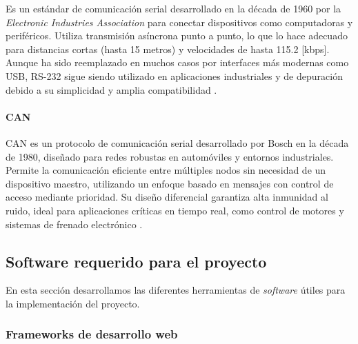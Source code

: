 Es un estándar de comunicación serial desarrollado en la década de 1960 por la \textit{Electronic Industries Association} para conectar dispositivos como computadoras y periféricos. Utiliza transmisión asíncrona punto a punto, lo que lo hace adecuado para distancias cortas (hasta 15 metros) y velocidades de hasta 115.2 [kbps]. Aunque ha sido reemplazado en muchos casos por interfaces más modernas como USB, RS-232 sigue siendo utilizado en aplicaciones industriales y de depuración debido a su simplicidad y amplia compatibilidad \cite{rs232spec}.

\paragraph{CAN}
CAN es un protocolo de comunicación serial desarrollado por Bosch en la década de 1980, diseñado para redes robustas en automóviles y entornos industriales. Permite la comunicación eficiente entre múltiples nodos sin necesidad de un dispositivo maestro, utilizando un enfoque basado en mensajes con control de acceso mediante prioridad. Su diseño diferencial garantiza alta inmunidad al ruido, ideal para aplicaciones críticas en tiempo real, como control de motores y sistemas de frenado electrónico \cite{canprotocol}.

\subsection{Software requerido para el proyecto}
En esta sección desarrollamos las diferentes herramientas de \textit{software} útiles para la implementación del proyecto.
\subsubsection{Frameworks de desarrollo web}
